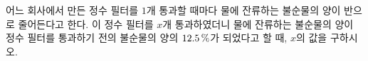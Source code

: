 어느 회사에서 만든 정수 필터를 $1$개 통과할 때마다 물에 잔류하는 불순물의 양이 반으로 줄어든다고 한다. 이 정수 필터를 $x$개 통과하였더니 물에 잔류하는 불순물의 양이 정수 필터를 통과하기 전의 불순물의 양의 $12.5\mkern3mu \%$가 되었다고 할 때, $x$의 값을 구하시오.
